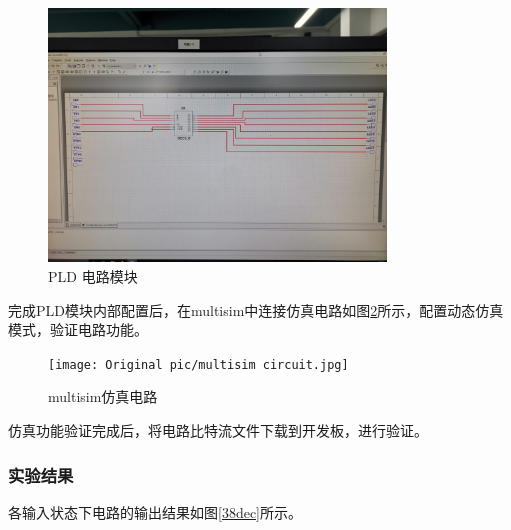 \documentclass[UTF8]{ctexart}
\numberwithin{figure}{subsection}
\numberwithin{table}{subsection}
\numberwithin{equation}{subsection}
\begin{document}
\begin{figure}[H]
    \begin{center}
        \includegraphics[width=0.8\textwidth]{Original pic/PLD circuit.jpg}
    \end{center}
    \caption{PLD 电路模块}
    \label{PLD circuit}
\end{figure}

\par 完成PLD模块内部配置后，在multisim中连接仿真电路如图\ref{multisim circuit}所示，配置动态仿真模式，验证电路功能。

\begin{figure}[H]
    \begin{center}
        \texttt{[image: Original pic/multisim circuit.jpg]}
    \end{center}
    \caption{multisim仿真电路}
    \label{multisim circuit}
\end{figure}

\par 仿真功能验证完成后，将电路比特流文件下载到开发板，进行验证。

\subsubsection{实验结果}
\par 各输入状态下电路的输出结果如图\ref{38dec}所示。
\end{document}
